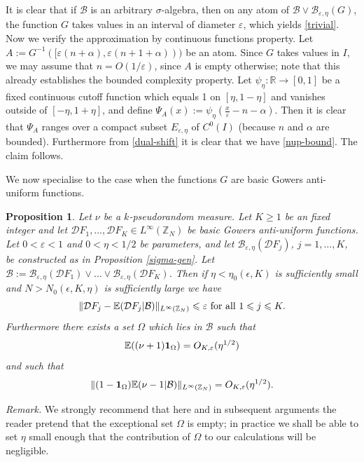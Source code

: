 \documentclass[12pt,a4paper,reqno]{amsart}
\numberwithin{equation}{section}
\theoremstyle{plain}
\newtheorem{proposition}[subsection]{Proposition}
\theoremstyle{definition}
\renewcommand{\leq}{\leqslant}
\renewcommand{\geq}{\geqslant}
\def\B{{\mathcal B}}
\def\D{{\mathcal D}}
\def\Z{{\mathbb Z}}
\def\E{{\mathbb E}}
\def\R{{\mathbb R}}
\def\eps{{\varepsilon}}
\def\vs{\vspace{11pt}}
\def\ni{\noindent}
\def\endproof{\hfill{\usebox{\proofbox}}}
\begin{document}
\ni It is clear that if $\B$ is an arbitrary $\sigma$-algebra, then on any atom of $\B \vee \B_{\eps,\eta}(G)$, the function $G$ takes values
in an interval of diameter $\eps$, which yields \eqref{trivial}.  
Now we verify the approximation by continuous functions property.  Let $A := G^{-1}([\eps (n+\alpha), \eps(n+1+\alpha)))$ be an atom.
Since $G$ takes values in $I$, we may assume that $n = O(1/\eps)$, since $A$ is empty otherwise; note that this already establishes
the bounded complexity property.  Let $\psi_\eta: \R \to [0,1]$ be a fixed continuous cutoff function which equals 1 on $[\eta, 1-\eta]$ and
vanishes outside of $[-\eta,1+\eta]$, and define $\Psi_A(x) := \psi_\eta( \frac{x}{\eps} - n - \alpha )$.  Then it is clear that $\Psi_A$
ranges over a compact subset $E_{\eps,\eta}$ of $C^0(I)$ (because $n$ and $\alpha$ are bounded).  Furthermore from \eqref{dual-shift} it is clear
that we have \eqref{nup-bound}.  The claim follows.
\endproof\vs

\ni We now specialise to the case when the functions $G$ are basic Gowers anti-uniform functions.

\begin{proposition}\label{bohr-sigma} Let $\nu$ be a $k$-pseudorandom measure.  Let $K \geq 1$ be an fixed integer and let $\D F_1, \ldots, \D F_K \in L^{\infty}(\Z_N)$ be 
basic Gowers anti-uniform functions.  Let $0 < \eps < 1$ and $0 < \eta < 1/2$ be parameters, and let $\B_{\eps,\eta}(\D F_j)$, $j=1,\ldots,K$,
be constructed as in Proposition \ref{sigma-gen}.  Let $\B := \B_{\eps,\eta}(\D F_1) \vee \ldots \vee \B_{\eps,\eta}(\D F_K)$.  Then if $\eta < \eta_0(\epsilon, K)$ is sufficiently small and $N > N_0(\epsilon, K, \eta)$ is sufficiently large we have
\begin{equation}\label{trivial-specific}
\| \D F_j - \E( \D F_j | \B) \|_{L^\infty(\Z_N)} \leq \eps \hbox{ for all } 1 \leq j \leq K.
\end{equation}
Furthermore there exists a set $\Omega$ which lies in $\B$ such that
\begin{equation}\label{mok-small} \E( (\nu + 1) {\bf 1}_{\Omega} ) = O_{K,\eps}(\eta^{1/2})
\end{equation}
and such that 
\begin{equation}\label{unif-mu}
 \| (1 - {\bf 1}_{\Omega}) \E(\nu - 1 | \B) \|_{L^\infty(\Z_N)} = O_{K,\eps}(\eta^{1/2}).
\end{equation}
\end{proposition}

\noindent\textit{Remark.} We strongly recommend that here and in subsequent arguments the reader pretend that the exceptional set $\Omega$ is empty; in practice we shall be able to set $\eta$ small enough
that the contribution of $\Omega$ to our calculations will be negligible.\vs
\end{document}
